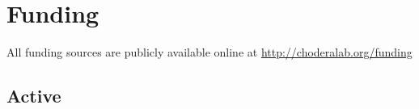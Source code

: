 \documentclass[10pt]{article}
\newcommand{\talk}[2]{
\noindent\marginpar{
   \scriptsize \scshape
  #2 \\ #1
}}
\begin{document}
%
%
%
%
%


%
%
\eject


\section*{Funding}

All funding sources are publicly available online at \url{http://choderalab.org/funding}

\subsection*{Active}
\end{document}
